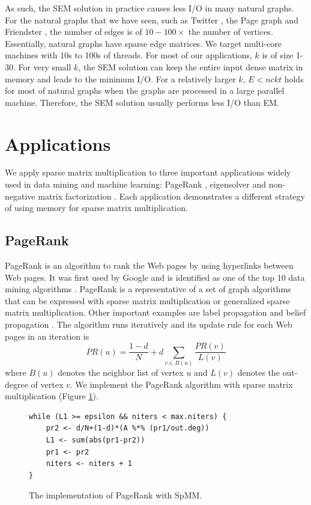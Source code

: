 As such, the SEM solution in practice causes less I/O in many natural graphs.
For the natural graphs that we have seen, such as Twitter \cite{twitter},
the Page graph \cite{web_graph} and Friendster \cite{friendster}, the number
of edges is of $10-100 \times$ the number of vertices. Essentially,
natural graphs have sparse edge matrices. We target multi-core machines with
10s to 100s of threads. For most of our applications, $k$ is of size 1-30.
For very small $k$, the SEM solution can keep the entire input dense matrix
in memory and leads to the minimum I/O. For a relatively larger $k$, $E < n c k t$
holds for most of natural graphs when the graphs are processed in a large
parallel machine. Therefore, the SEM solution usually performs less I/O than EM.

\section{Applications} \label{sec:apps}
We apply sparse matrix multiplication to three important applications widely
used in data mining and machine learning: PageRank \cite{pagerank},
eigensolver \cite{anasazi} and non-negative matrix factorization \cite{nmf}.
Each application demonstrates a different strategy of using memory for sparse
matrix multiplication.

\subsection{PageRank} \label{sec:pagerank}
PageRank is an algorithm to rank the Web pages by using hyperlinks between Web
pages. It was first used by Google and is identified as one of the top 10 data
mining algorithms \cite{top10}. PageRank is a representative of a set of graph
algorithms that can be expressed with sparse matrix multiplication or generalized
sparse matrix multiplication. Other important examples are label propagation
\cite{label_prop} and belief propagation \cite{Yedidia03}. The algorithm runs
iteratively and its update rule for each Web pages in an iteration is
\begin{equation*}
PR(u) = \frac{1-d}{N} + d \sum\limits_{v \in B(u)} \frac{PR(v)}{L(v)}
\end{equation*}
where $B(u)$ denotes the neighbor list of vertex $u$ and $L(v)$ denotes
the out-degree of vertex $v$. We implement the PageRank algorithm with sparse
matrix multiplication (Figure \ref{code:pagerank}).


\begin{figure}
\centering
\begin{lstlisting}
while (L1 >= epsilon && niters < max.niters) {
	pr2 <- d/N+(1-d)*(A %*% (pr1/out.deg))
	L1 <- sum(abs(pr1-pr2))
	pr1 <- pr2
	niters <- niters + 1
}
\end{lstlisting}
\caption{The implementation of PageRank \cite{pagerank} with SpMM.}
\label{code:pagerank}
\end{figure}

